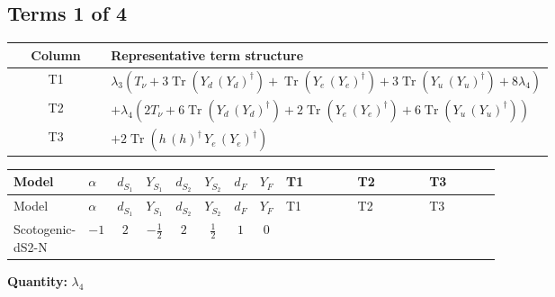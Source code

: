 \documentclass[8pt]{article}
\begin{document}
\begin{landscape}
\subsection*{Terms 1 of 4}
\begin{center}
\begin{tabular}{@{}c >{\raggedright\arraybackslash}p{0.82\linewidth}@{}}
\toprule
Column & Representative term structure \\
\midrule
T1 & \(\displaystyle {\lambda_3} (T_\nu+3 \operatorname{Tr}\!\left({Y_d}\,\left({Y_d}\right)^{\dagger}\right)+\operatorname{Tr}\!\left({Y_e}\,\left({Y_e}\right)^{\dagger}\right)+3 \operatorname{Tr}\!\left({Y_u}\,\left({Y_u}\right)^{\dagger}\right)+8 {\lambda_4})\) \\
\midrule
T2 & \(\displaystyle +{\lambda_4} (2 T_\nu+6 \operatorname{Tr}\!\left({Y_d}\,\left({Y_d}\right)^{\dagger}\right)+2 \operatorname{Tr}\!\left({Y_e}\,\left({Y_e}\right)^{\dagger}\right)+6 \operatorname{Tr}\!\left({Y_u}\,\left({Y_u}\right)^{\dagger}\right))\) \\
\midrule
T3 & \(\displaystyle +2 \operatorname{Tr}\!\left({h}\,\left({h}\right)^{\dagger}\,{Y_e}\,\left({Y_e}\right)^{\dagger}\right)\) \\
\midrule
\bottomrule
\end{tabular}
\end{center}
\smallskip
\tiny
\begin{longtable}{@{}llcccccc >{\raggedright\arraybackslash}p{0.21\linewidth} >{\raggedright\arraybackslash}p{0.21\linewidth} >{\raggedright\arraybackslash}p{0.21\linewidth}@{}}
\toprule
Model & $\alpha$ & $d_{S_1}$ & $Y_{S_1}$ & $d_{S_2}$ & $Y_{S_2}$ & $d_F$ & $Y_F$ & T1 & T2 & T3 \\
\midrule
\endfirsthead
\toprule
Model & $\alpha$ & $d_{S_1}$ & $Y_{S_1}$ & $d_{S_2}$ & $Y_{S_2}$ & $d_F$ & $Y_F$ & T1 & T2 & T3 \\
\midrule
\endhead
Scotogenic-dS2-N & $-1$ & $2$ & $-\frac{1}{2}$ & $2$ & $\frac{1}{2}$ & $1$ & $0$ & \scriptsize\adjustbox{max width=\linewidth}{$\begin{gathered} {\lambda_3} (T_\nu+3 \operatorname{Tr}\!\left({Y_d}\,\left({Y_d}\right)^{\dagger}\right)+\operatorname{Tr}\!\left({Y_e}\,\left({Y_e}\right)^{\dagger}\right)+3 \operatorname{Tr}\!\left({Y_u}\,\left({Y_u}\right)^{\dagger}\right)+8 {\lambda_4})\end{gathered}$} & \scriptsize\adjustbox{max width=\linewidth}{$\begin{gathered} +{\lambda_4} (2 T_\nu+6 \operatorname{Tr}\!\left({Y_d}\,\left({Y_d}\right)^{\dagger}\right)+2 \operatorname{Tr}\!\left({Y_e}\,\left({Y_e}\right)^{\dagger}\right)+6 \operatorname{Tr}\!\left({Y_u}\,\left({Y_u}\right)^{\dagger}\right))\end{gathered}$} & \scriptsize\adjustbox{max width=\linewidth}{$\begin{gathered} +2 \operatorname{Tr}\!\left({h}\,\left({h}\right)^{\dagger}\,{Y_e}\,\left({Y_e}\right)^{\dagger}\right)\end{gathered}$} \\
\midrule
\bottomrule
\end{longtable}
\clearpage
\noindent\textbf{Quantity: }$\lambda_4$\par\smallskip

\end{landscape}
\end{document}
